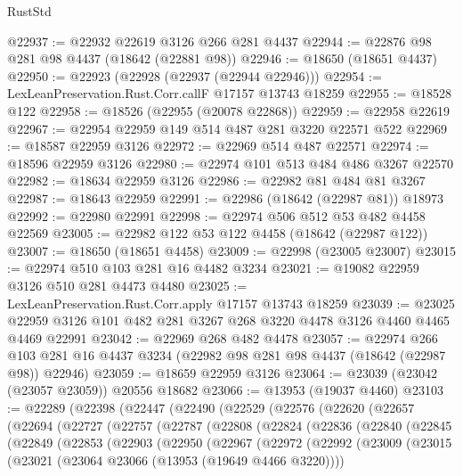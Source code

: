 \begin{lexlean}{RustStd}
\begin{coremodule}
@22937 := @22932 @22619 @3126 @266 @281 @4437
@22944 := @22876 @98 @281 @98 @4437 (@18642 (@22881 @98))
@22946 := @18650 (@18651 @4437)
@22950 := @22923 (@22928 (@22937 (@22944 @22946)))
@22954 := LexLeanPreservation.Rust.Corr.callF @17157 @13743 @18259
@22955 := @18528 @122
@22958 := @18526 (@22955 (@20078 @22868))
@22959 := @22958 @22619
@22967 := @22954 @22959 @149 @514 @487 @281 @3220 @22571 @522
@22969 := @18587 @22959 @3126
@22972 := @22969 @514 @487 @22571
@22974 := @18596 @22959 @3126
@22980 := @22974 @101 @513 @484 @486 @3267 @22570
@22982 := @18634 @22959 @3126
@22986 := @22982 @81 @484 @81 @3267
@22987 := @18643 @22959
@22991 := @22986 (@18642 (@22987 @81)) @18973
@22992 := @22980 @22991
@22998 := @22974 @506 @512 @53 @482 @4458 @22569
@23005 := @22982 @122 @53 @122 @4458 (@18642 (@22987 @122))
@23007 := @18650 (@18651 @4458)
@23009 := @22998 (@23005 @23007)
@23015 := @22974 @510 @103 @281 @16 @4482 @3234
@23021 := @19082 @22959 @3126 @510 @281 @4473 @4480
@23025 := LexLeanPreservation.Rust.Corr.apply @17157 @13743 @18259
@23039 := @23025 @22959 @3126 @101 @482 @281 @3267 @268 @3220 @4478 @3126 @4460 @4465 @4469 @22991
@23042 := @22969 @268 @482 @4478
@23057 := @22974
    @266
    @103
    @281
    @16
    @4437
    @3234
    (@22982 @98 @281 @98 @4437 (@18642 (@22987 @98)) @22946)
@23059 := @18659 @22959 @3126
@23064 := @23039 (@23042 (@23057 @23059)) @20556 @18682
@23066 := @13953 (@19037 @4460)
@23103 := @22289
    (@22398
      (@22447
        (@22490
          (@22529
            (@22576
              (@22620
                (@22657
                  (@22694
                    (@22727
                      (@22757
                        (@22787
                          (@22808
                            (@22824
                              (@22836
                                (@22840
                                  (@22845
                                    (@22849
                                      (@22853
                                        (@22903
                                          (@22950
                                            (@22967
                                              (@22972
                                                (@22992
                                                  (@23009
                                                    (@23015
                                                      (@23021
                                                        (@23064
                                                          @23066
                                                          (@13953 (@19649 @4466 @3220))))

\end{coremodule}
\end{lexlean}
